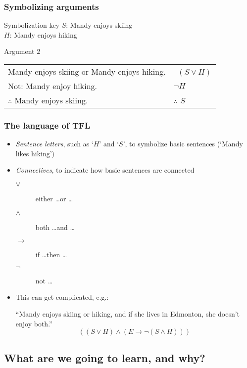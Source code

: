 \begin{frame}
  \frametitle{Symbolizing arguments}

  \begin{block}{Symbolization key}
  $S$: Mandy enjoys skiing\\
  $H$: Mandy enjoys hiking
  \end{block}

  \begin{block}{Argument 2}
    \begin{tabular}{@{}l@{}l@{}}
      Mandy enjoys skiing or Mandy enjoys hiking.  & \ \emph{$(S \lor H)$}\\
      Not: Mandy enjoy hiking. & \emph{$\lnot H$}\\
      $\therefore$ Mandy enjoys skiing. & $\therefore$ \emph{$S$}
    \end{tabular}
  \end{block}
\end{frame}

\begin{frame}
  \frametitle{The language of TFL}

  \begin{itemize}[<+->]
  \item \emph{Sentence letters}, such as `$H$' and `$S$', to symbolize basic sentences (`Mandy likes hiking')
  \item \emph{Connectives}, to indicate how basic sentences are connected
  \begin{description}
    \item[$\lor$] either \dots or \dots
    \item[$\land$] both \dots and \dots
    \item[$\to$] if \dots then \dots
    \item[$\lnot$] not \dots
  \end{description}

  \item[] This can get complicated, e.g.:

  ``Mandy enjoys skiing or hiking, and if she lives in Edmonton, she
  doesn't enjoy both.''
  \[
  ((S \lor H) \land (E \to \lnot(S \land H)))
  \]
  \end{itemize}
\end{frame}

\subsection{What are we going to learn, and why?}

